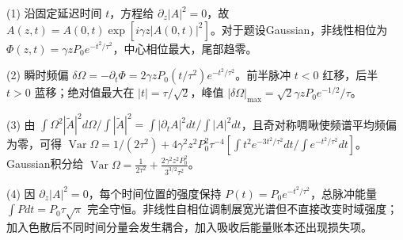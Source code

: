 (1) 沿固定延迟时间 \(t\)，方程给 \(\partial_z|A|^2=0\)，故 \(A(z,t)=A(0,t)\exp[i\gamma z|A(0,t)|^2]\)。对于题设Gaussian，非线性相位为 \(\Phi(z,t)=\gamma zP_0e^{-t^2/\tau^2}\)，中心相位最大，尾部趋零。

(2) 瞬时频偏 \(\delta\Omega=-\partial_t\Phi=2\gamma zP_0(t/\tau^2)e^{-t^2/\tau^2}\)。前半脉冲 \(t<0\) 红移，后半 \(t>0\) 蓝移；绝对值最大在 \(|t|=\tau/\sqrt2\)，峰值 \(\boxed{|\delta\Omega|_{\max}=\sqrt2\gamma zP_0e^{-1/2}/\tau}\)。

(3) 由 \(\int\Omega^2|\widetilde A|^2d\Omega/\int|\widetilde A|^2=\int|\partial_tA|^2dt/\int|A|^2dt\)，且奇对称啁啾使频谱平均频偏为零，可得 \(\operatorname{Var}\Omega=1/(2\tau^2)+4\gamma^2z^2P_0^2\tau^{-4}[\int t^2e^{-3t^2/\tau^2}dt/\int e^{-t^2/\tau^2}dt]\)。Gaussian积分给 \(\boxed{\operatorname{Var}\Omega=\frac1{2\tau^2}+\frac{2\gamma^2z^2P_0^2}{3^{3/2}\tau^2}}\)。

(4) 因 \(\partial_z|A|^2=0\)，每个时间位置的强度保持 \(P(t)=P_0e^{-t^2/\tau^2}\)，总脉冲能量 \(\int Pdt=P_0\tau\sqrt\pi\) 完全守恒。非线性自相位调制展宽光谱但不直接改变时域强度；加入色散后不同时间分量会发生耦合，加入吸收后能量账本还出现损失项。
